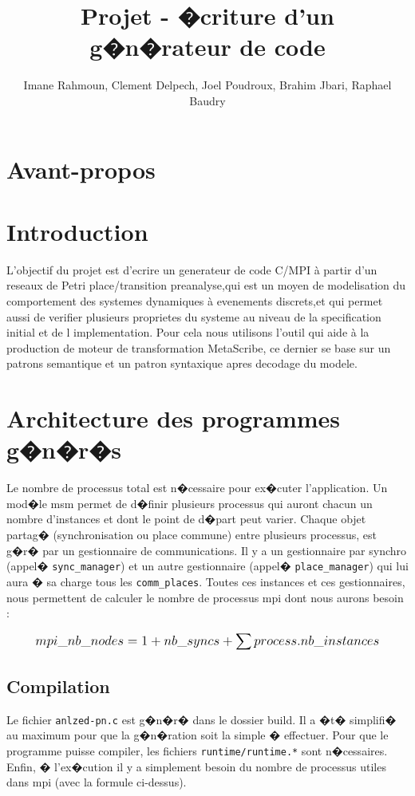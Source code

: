 \documentclass[10pt,a4paper]{article}
\title{\HeaderSar
Projet - �criture d'un g�n�rateur de code
}
\author{
Imane Rahmoun,
Clement Delpech,
Joel Poudroux,
Brahim Jbari,
Raphael Baudry}
\begin{document}
\maketitle
\vskip 2cm
\tableofcontents
\vfill
\eject

\section*{Avant-propos}


\section{Introduction}
L'objectif du projet est d'ecrire un generateur de code C/MPI à partir d'un 
reseaux de Petri place/transition preanalyse,qui est  un moyen 
de modelisation du comportement des systemes dynamiques à evenements discrets,et 
qui permet aussi de verifier plusieurs proprietes du systeme au niveau de la specification initial et de l implementation.
Pour cela nous utilisons l'outil qui aide à la production de moteur de transformation MetaScribe,
ce dernier se base sur un  patrons semantique et un patron syntaxique apres decodage du modele.
\section{Architecture des programmes g�n�r�s}

Le nombre de processus total est n�cessaire pour ex�cuter l'application.
Un mod�le msm permet de d�finir plusieurs processus qui auront chacun un
nombre d'instances et dont le point de d�part peut varier. Chaque objet
partag� (synchronisation ou place commune) entre plusieurs processus, est
g�r� par un gestionnaire de communications. Il y a un gestionnaire par
synchro (appel� {\tt sync\_manager}) et un autre gestionnaire (appel�
{\tt place\_manager}) qui lui aura � sa charge tous les {\tt comm\_places}.
Toutes ces instances et ces gestionnaires, nous permettent de calculer le
nombre de processus mpi dont nous aurons besoin :

\begin{align*}
\mbox{\large$\displaystyle mpi\_nb\_nodes = 1 + nb\_syncs +
  \sum{process.nb\_instances}$}
\end{align*}


\subsection{Compilation}

Le fichier {\tt anlzed-pn.c} est g�n�r� dans le dossier build. Il a �t� simplifi� au
maximum pour que la g�n�ration soit la simple � effectuer. Pour que le programme
puisse compiler, les fichiers {\tt runtime/runtime.*} sont n�cessaires. Enfin, �
l'ex�cution il y a simplement besoin du nombre de processus utiles dans mpi (avec
la formule ci-dessus).
\end{document}
